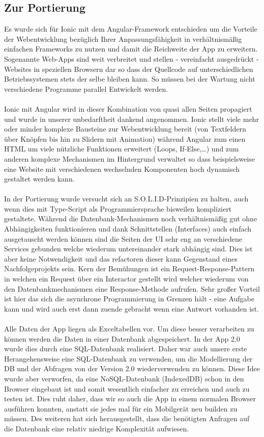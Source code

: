 \subsection{Zur Portierung}
Es wurde sich für Ionic mit dem Angular-Framework entschieden um die Vorteile der Webentwicklung bezüglich Ihrer Anpassungsfähigkeit in verhältnismäßig einfachen Frameworks zu nutzen und damit die Reichweite der App zu erweitern. Sogenannte \glqq Web-Apps\grqq{} sind weit verbreitet und stellen - vereinfacht ausgedrückt - Websites in speziellen Browsern dar so dass der Quellcode auf unterschiedlichen Betriebssystemen stets der selbe bleiben kann. So müssen bei der Wartung nicht verschiedene Programme parallel Entwickelt werden.\\\\
Ionic mit Angular wird in dieser Kombination von quasi allen Seiten propagiert und wurde in unserer unbedarftheit dankend angenommen. Ionic stellt viele mehr oder minder komplexe Bausteine zur Webentwicklung bereit (von Textfeldern über Knöpfen bis hin zu Slidern mit Animation) während Angular zum einen HTML um viele nützliche \glqq Funktionen\grqq{} erweitert (Loops, If-Else,\dots) und zum anderen komplexe Mechanismen im Hintergrund verwaltet so dass beispielsweise eine Website mit verschiedenen wechselnden Komponenten hoch dynamisch gestaltet werden kann.\\\\
In der Portierung wurde versucht sich an S.O.L.I.D-Prinzipien zu halten, auch wenn dies mit Type-Script als Programmiersprache bisweilen kompliziert gestaltete. Während die Datenbank-Mechanismen noch verhältnismäßig gut ohne Abhängigkeiten funktionieren und dank Schnittstellen (Interfaces) auch einfach ausgetauscht werden können sind die Seiten der UI sehr eng an verschiedene \glqq Services\grqq{} gebunden welche wiederum untereinander stark abhängig sind. Dies ist aber keine Notwendigkeit und das refactoren dieser kann Gegenstand eines Nachfolgeprojekts sein. Kern der Bemühungen ist ein \glqq Request-Response\grqq -Pattern in welchen ein Request über ein Interactor gestellt wird welcher wiederum von den Datenbankmechanismen eine Response-Methode aufrufen. Sehr großer Vorteil ist hier das sich die asynchrone Programmierung in Grenzen hält - eine Aufgabe kann und wird auch erst dann zuende gebracht wenn eine Antwort vorhanden ist.\\\\
Alle Daten der App liegen als Exceltabellen vor. Um diese besser verarbeiten zu können werden die Daten in einer Datenbank abgespeichert. In der App 2.0 wurde dies durch eine SQL-Datenbank realisiert. Daher war auch unsere erste Herangehensweise eine SQL-Datenbank zu verwenden, um die Modellierung der DB und der Abfragen von der Version 2.0 wiederverwenden zu können. Diese Idee wurde aber verworfen, da eine NoSQL-Datenbank (IndexedDB) schon in den Browser eingebaut ist und somit wesentlich einfacher zu erreichen und auch zu testen ist. Dies ruht daher, dass wir so auch die App in einem normalen Browser ausführen konnten, anstatt sie jedes mal für ein Mobilgerät neu \glqq builden\grqq{} zu müssen. Des weiteren hat sich herausgestellt, dass die  benötigten Anfragen auf die Datenbank eine relativ niedrige Komplexität aufwiesen.
